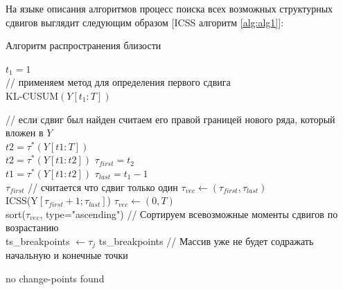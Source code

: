 \documentclass[a4paper,14pt,russian]{extarticle}
\begin{document}
	\par
	На языке описания алгоритмов процесс поиска всех возможных структурных сдвигов выглядит следующим образом [ICSS алгоритм \ref{alg:alg1}]:
	\begin{algorithm}
		\caption{\label{alg:alg1}Алгоритм распространения близости}
		\SetAlgoLined
		{
			$t_1 = 1$ \\
			// применяем метод для определения первого сдвига \\
			KL-CUSUM$( Y \left[ t_1: T \right] )$ \\
			{
				// если сдвиг был найден считаем его правой границей нового ряда, который вложен в $Y$ \\
				$t2 = \tau^*(Y \left[t1:T\right])$ \\
				{
					$t2 = \tau^*(Y \left[t1:t2\right])$
				}
				$\tau_{first} = t_2$ \\
				{
					$t1 = \tau^*(Y \left[t1:t2\right])$
				}
				$\tau_{last} = t_1 - 1$ \\
				{
					\Return $\tau_{first}$ // считается что сдвиг только один
				}
				{
					$\tau_{vec} \longleftarrow \left(\tau_{first}, \tau_{last}\right)$ \\
					ICSS(Y$\left[\tau_{first} + 1; \tau_{last}\right]$)
				}
				{
					$\tau_{vec} \longleftarrow \left(0, T\right)$ \\
					sort($\tau_{vec}$, type="ascending") // Сортируем всевозможные моменты сдвигов по возрастанию \\
					{
						{
							ts\_breakpoints $\longleftarrow \tau_j$
						}
					}
					\Return ts\_breakpoints // Массив уже не будет содражать начальную и конечные точки \\
				}
				
				
			}{\Return no change-points found}	
		}
		
	\end{algorithm}
	
	\clearpage
\end{document}
